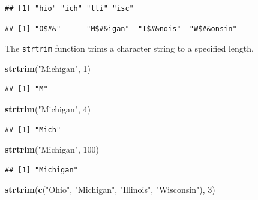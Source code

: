 \documentclass[
]{krantz}
\newenvironment{Shaded}{\begin{snugshade}}{\end{snugshade}}
\newcommand{\DecValTok}[1]{\textcolor[rgb]{0.00,0.00,0.81}{#1}}
\newcommand{\KeywordTok}[1]{\textcolor[rgb]{0.13,0.29,0.53}{\textbf{#1}}}
\newcommand{\NormalTok}[1]{#1}
\newcommand{\StringTok}[1]{\textcolor[rgb]{0.31,0.60,0.02}{#1}}
\begin{document}
\begin{verbatim}
## [1] "hio" "ich" "lli" "isc"
\end{verbatim}

\begin{Shaded}
\end{Shaded}

\begin{verbatim}
## [1] "O$#&"      "M$#&igan"  "I$#&nois"  "W$#&onsin"
\end{verbatim}

The \texttt{strtrim} function trims a character string to a specified length.

\begin{Shaded}
\begin{Highlighting}[]
\KeywordTok{strtrim}\NormalTok{(}\StringTok{"Michigan"}\NormalTok{, }\DecValTok{1}\NormalTok{)}
\end{Highlighting}
\end{Shaded}

\begin{verbatim}
## [1] "M"
\end{verbatim}

\begin{Shaded}
\begin{Highlighting}[]
\KeywordTok{strtrim}\NormalTok{(}\StringTok{"Michigan"}\NormalTok{, }\DecValTok{4}\NormalTok{)}
\end{Highlighting}
\end{Shaded}

\begin{verbatim}
## [1] "Mich"
\end{verbatim}

\begin{Shaded}
\begin{Highlighting}[]
\KeywordTok{strtrim}\NormalTok{(}\StringTok{"Michigan"}\NormalTok{, }\DecValTok{100}\NormalTok{)}
\end{Highlighting}
\end{Shaded}

\begin{verbatim}
## [1] "Michigan"
\end{verbatim}

\begin{Shaded}
\begin{Highlighting}[]
\KeywordTok{strtrim}\NormalTok{(}\KeywordTok{c}\NormalTok{(}\StringTok{"Ohio"}\NormalTok{, }\StringTok{"Michigan"}\NormalTok{, }\StringTok{"Illinois"}\NormalTok{, }\StringTok{"Wisconsin"}\NormalTok{), }\DecValTok{3}\NormalTok{)}
\end{Highlighting}
\end{Shaded}
\end{document}
